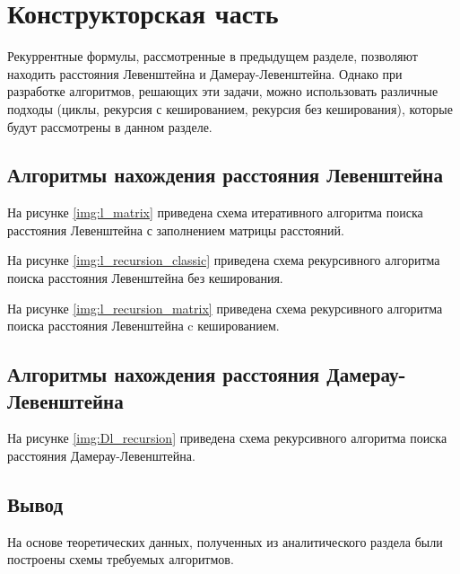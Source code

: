 \chapter{Конструкторская часть}

Рекуррентные формулы, рассмотренные в предыдущем разделе, позволяют находить расстояния Левенштейна и Дамерау-Левенштейна. Однако при разработке алгоритмов, решающих эти задачи, можно использовать различные подходы (циклы, рекурсия с кешированием, рекурсия без кеширования), которые будут рассмотрены в данном разделе.

\section{Алгоритмы нахождения расстояния Левенштейна}

На рисунке \ref{img:l_matrix} приведена схема итеративного алгоритма поиска расстояния Левенштейна с заполнением матрицы расстояний.


На рисунке \ref{img:l_recursion_classic} приведена схема рекурсивного алгоритма поиска расстояния Левенштейна без кеширования.


На рисунке \ref{img:l_recursion_matrix} приведена схема рекурсивного алгоритма поиска расстояния Левенштейна c кешированием.


\section{Алгоритмы нахождения расстояния Дамерау-Левенштейна}

На рисунке \ref{img:Dl_recursion} приведена схема рекурсивного алгоритма поиска расстояния Дамерау-Левенштейна.




\section*{Вывод}

На основе теоретических данных, полученных из аналитического раздела были построены схемы требуемых алгоритмов.



